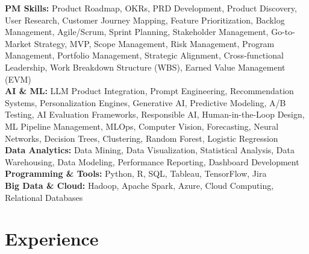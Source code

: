 \documentclass[10pt, letterpaper]{article}
\begin{document}
\textbf{PM Skills:} Product Roadmap, OKRs, PRD Development, Product Discovery, User Research, Customer Journey Mapping, Feature Prioritization, Backlog Management, Agile/Scrum, Sprint Planning, Stakeholder Management, Go-to-Market Strategy, MVP, Scope Management, Risk Management, Program Management, Portfolio Management, Strategic Alignment, Cross-functional Leadership, Work Breakdown Structure (WBS), Earned Value Management (EVM)\\
\textbf{AI \& ML:} LLM Product Integration, Prompt Engineering, Recommendation Systems, Personalization Engines, Generative AI, Predictive Modeling, A/B Testing, AI Evaluation Frameworks, Responsible AI, Human-in-the-Loop Design, ML Pipeline Management, MLOps, Computer Vision, Forecasting, Neural Networks, Decision Trees, Clustering, Random Forest, Logistic Regression\\
\textbf{Data Analytics:} Data Mining, Data Visualization, Statistical Analysis, Data Warehousing, Data Modeling, Performance Reporting, Dashboard Development\\
\textbf{Programming \& Tools:} Python, R, SQL, Tableau, TensorFlow, Jira\\
\textbf{Big Data \& Cloud:} Hadoop, Apache Spark, Azure, Cloud Computing, Relational Databases

\section{Experience}
\end{document}
